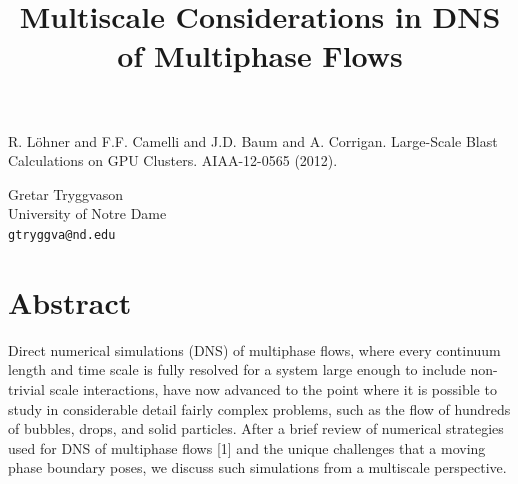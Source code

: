\documentclass[article, A4, 11pt]{llncs}%
\begin{document}

\begin{thebibliography}{10}
{\sc R. Löhner and F.F. Camelli and J.D. Baum and A. Corrigan}. {Large-Scale Blast Calculations on GPU Clusters}. AIAA-12-0565 (2012).

\end{thebibliography} %


\title{Multiscale Considerations in DNS of Multiphase Flows}
 \author{} \institute{}
\maketitle
\begin{center}
{\large Gretar Tryggvason}\\
University of Notre Dame\\
{\tt gtryggva@nd.edu}
\end{center}

\section*{Abstract}
Direct numerical simulations (DNS) of multiphase flows, where every continuum length and time scale is fully resolved for a system large enough to include non-trivial scale interactions, have now advanced to the point where it is possible to study in considerable detail fairly complex problems, such as the flow of hundreds of bubbles, drops, and solid particles. After a brief review of numerical strategies used for DNS of multiphase flows [1] and the unique challenges that a moving phase boundary poses, we discuss such simulations from a multiscale perspective.
\end{document}
